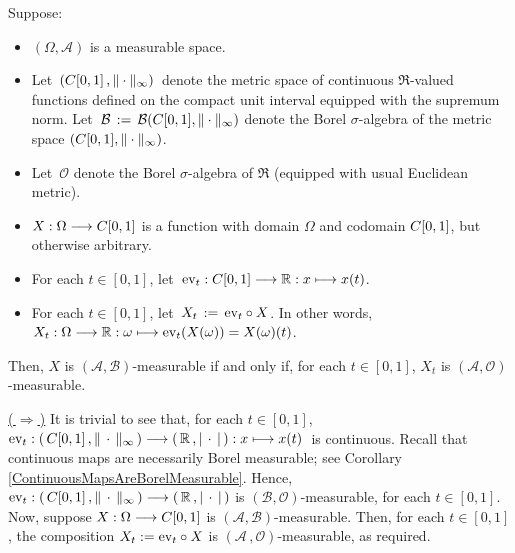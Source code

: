 \vskip 0.8cm
\begin{theorem}
\mbox{}\vskip 0.1cm
\noindent
Suppose:
\begin{itemize}
\item	$\left(\Omega,\mathcal{A}\right)$ is a measurable space.
\item	Let \,$(C[0,1]\,,\Vert\cdot\Vert_{\infty})$\, denote the metric space
		of continuous $\Re$-valued functions defined on the compact unit interval
		equipped with the supremum norm.
		\vskip 0.1cm
		Let \,$\mathcal{B} \,:=\, \mathcal{B}(C[0,1],\Vert\cdot\Vert_{\infty})$ denote the Borel $\sigma$-algebra
		of the metric space $(C[0,1],\Vert\cdot\Vert_{\infty})$.
\item	Let \,$\mathcal{O}$ denote the Borel $\sigma$-algebra of $\Re$ (equipped with usual Euclidean metric).
\item	$X : \Omega \longrightarrow C[0,1]$ is a function with domain $\Omega$
		and codomain $C[0,1]$, but otherwise arbitrary.
\item	For each $t \in [0,1]$, let \,$\textnormal{ev}_{t} : C[0,1] \longrightarrow \mathbb{R} : x \longmapsto x(t)$.
\item 	For each $t \in [0,1]$, let \,$X_{t} \,:=\, \textnormal{ev}_{t} \circ X$.
		In other words, $X_{t} : \Omega \longrightarrow \mathbb{R} : \omega \longmapsto \textnormal{ev}_{t}(X(\omega)) = X(\omega)(t)$.
\end{itemize}
Then, $X$ is $\left(\mathcal{A},\mathcal{B}\right)$-measurable if and only if,
for each $t \in [0,1]$, $X_{t}$ is $\left(\mathcal{A},\mathcal{O}\right)$-measurable.
\end{theorem}
\proof
\vskip 0.3cm
\noindent
\underline{(\,$\Longrightarrow$\,)}\vskip 0.2cm
\noindent
It is trivial to see that, for each $t \in [0,1]$,
\,$\textnormal{ev}_{t} : \left(\,C[0,1]\,,\Vert\,\cdot\,\Vert_{\infty}\,\right) \longrightarrow \left(\,\mathbb{R}\,,\vert\,\cdot\,\vert\,\right) : x \longmapsto x(t)$\, is continuous.
Recall that continuous maps are necessarily Borel measurable; see Corollary \ref{ContinuousMapsAreBorelMeasurable}.
Hence,
$\textnormal{ev}_{t} : \left(\,C[0,1]\,,\Vert\,\cdot\,\Vert_{\infty}\,\right) \longrightarrow \left(\,\mathbb{R}\,,\vert\,\cdot\,\vert\,\right)$
is $(\mathcal{B},\mathcal{O})$-measurable, for each $t \in [0,1]$.
Now, suppose $X : \Omega \longrightarrow C[0,1]$ is $(\mathcal{A},\mathcal{B})$-measurable.
Then, for each $t \in [0,1]$, the composition
$X_{t} := \textnormal{ev}_{t} \circ X$ is $(\mathcal{A}\,,\mathcal{O})$-measurable, as required.

